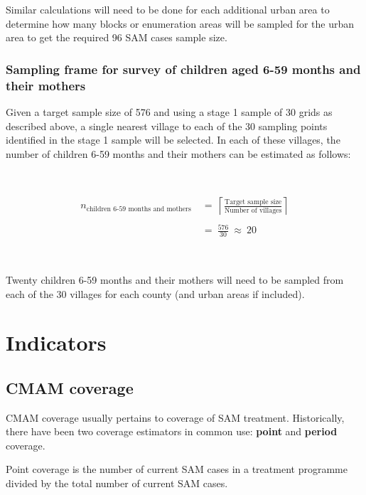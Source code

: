 \documentclass[12pt,a4paper]{book}
\theoremstyle{definition}
\theoremstyle{definition}
\theoremstyle{definition}
\theoremstyle{remark}
\begin{document}
Similar calculations will need to be done for each additional urban area
to determine how many blocks or enumeration areas will be sampled for
the urban area to get the required 96 SAM cases sample size.

\hypertarget{sampling-frame-for-survey-of-children-aged-6-59-months-and-their-mothers}{%
\subsection{Sampling frame for survey of children aged 6-59 months and
their
mothers}\label{sampling-frame-for-survey-of-children-aged-6-59-months-and-their-mothers}}

Given a target sample size of 576 and using a stage 1 sample of 30 grids
as described above, a single nearest village to each of the 30 sampling
points identified in the stage 1 sample will be selected. In each of
these villages, the number of children 6-59 months and their mothers can
be estimated as follows:

~

\[\begin{aligned} 
n_{\text{children 6-59 months and mothers}} & ~ = ~ \left \lceil \frac{\text{Target sample size}}{\text{Number of villages}} \right \rceil \\
\\
& ~ = ~ \frac{576}{30} ~ \approx ~ 20
\end{aligned}\]

~

Twenty children 6-59 months and their mothers will need to be sampled
from each of the 30 villages for each county (and urban areas if
included).

\hypertarget{indicators}{%
\chapter{Indicators}\label{indicators}}

\hypertarget{cmam-coverage}{%
\section{CMAM coverage}\label{cmam-coverage}}

CMAM coverage usually pertains to coverage of SAM treatment.
Historically, there have been two coverage estimators in common use:
\textbf{point} and \textbf{period} coverage.

Point coverage is the number of current SAM cases in a treatment
programme divided by the total number of current SAM cases.
\end{document}
